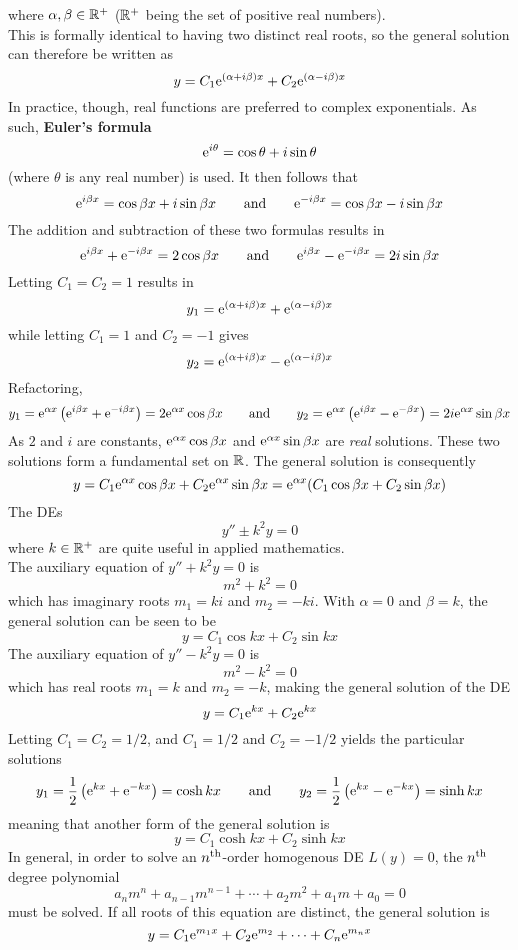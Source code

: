 \documentclass[./Differential Equations]{subfiles}
\begin{document}
					where \(\alpha, \beta \in \mathbb{R}^+\) (\(\mathbb{R}^+\) being the set of positive real numbers). \\
					This is formally identical to having two distinct real roots, so the general solution can therefore be written as
					\[y = C_1\text{e}^{(\alpha + i\beta)x} + C_2\text{e}^{(\alpha - i\beta)x}\]
					In practice, though, real functions are preferred to complex exponentials. As such, \textbf{Euler's formula}
					\[\text{e}^{i\theta} = \cos\theta + i\sin\theta\]
					(where \(\theta\) is any real number) is used. It then follows that
					\[
						\text{e}^{i\beta x} = \cos\beta x + i\sin\beta x \qquad \text{and} \qquad
								\text{e}^{-i\beta x} = \cos\beta x - i\sin\beta x
					\]
					The addition and subtraction of these two formulas results in
					\[
						\text{e}^{i\beta x} + \text{e}^{-i\beta x} = 2\cos\beta x \qquad \text{and} \qquad
								\text{e}^{i\beta x} - \text{e}^{-i\beta x} = 2i\sin \beta x	
					\]
					Letting \(C_1 = C_2 = 1\) results in
					\[
						y_1 = \text{e}^{(\alpha + i\beta)x} + \text{e}^{(\alpha - i\beta)x}
					\]
					while letting \(C_1 = 1\) and \(C_2 = -1\) gives
					\[
						y_2 = \text{e}^{(\alpha + i\beta)x} - \text{e}^{(\alpha - i\beta)x}
					\]
					Refactoring,
					\[
						y_1 = \text{e}^{\alpha x}\left(\text{e}^{i\beta x} + \text{e}^{-i\beta x}\right) = 2\text{e}^{\alpha x}\cos\beta x \qquad \text{and} \qquad
								y_2 = \text{e}^{\alpha x}\left(\text{e}^{i\beta x} - \text{e}^{-\beta x}\right) = 2i\text{e}^{\alpha x}\sin\beta x
					\]
					As \(2\) and \(i\) are constants, \(\text{e}^{\alpha x}\cos\beta x\) and \(\text{e}^{\alpha x}\sin\beta x\) are \textit{real} solutions. These two solutions form a fundamental set on \(\mathbb{R}\). The general solution is consequently
					\[
						y = C_1\text{e}^{\alpha x}\cos\beta x + C_2\text{e}^{\alpha x}\sin\beta x
							= \text{e}^{\alpha x}(C_1\cos\beta x + C_2\sin\beta x) 
					\]
				The DEs
					\[y'' \pm k^2y = 0\]
					where \(k \in \mathbb{R}^+\) are quite useful in applied mathematics. \\
				The auxiliary equation of \(y'' + k^2y = 0\) is
					\[m^2 + k^2 = 0\]
					which has imaginary roots \(m_1 = ki\) and \(m_2 = -ki\). With \(\alpha = 0\) and \(\beta = k\), the general solution can be seen to be
					\[y = C_1\cos kx + C_2\sin kx\]
				The auxiliary equation of \(y'' - k^2y = 0\) is
					\[m^2 - k^2 = 0\]
					which has real roots \(m_1 = k\) and \(m_2 = -k\), making the general solution of the DE
					\[y = C_1\text{e}^{kx} + C_2\text{e}^{kx}\]
				Letting \(C_1 = C_2 = 1/2\), and \(C_1 = 1/2\) and \(C_2 = -1/2\) yields the particular solutions
					\[
						y_1 = \frac{1}{2}\left(\text{e}^{kx} + \text{e}^{-kx}\right) = \cosh kx \qquad \text{and} \qquad
								y_2 = \frac{1}{2}\left(\text{e}^{kx} - \text{e}^{-kx}\right) = \sinh kx 
					\]
					meaning that another form of the general solution is
					\[y = C_1\cosh kx + C_2\sinh kx\]
				In general, in order to solve an \(n^{\text{th}}\)-order homogenous DE \(L(y) = 0\), the \(n^{\text{th}}\) degree polynomial
					\[a_nm^n + a_{n - 1}m^{n - 1} + \cdots + a_2m^2 + a_1m + a_0 = 0\]
					must be solved. If all roots of this equation are distinct, the general solution is
					\[y = C_1\text{e}^{m_1x} + C_2\text{e}^{m_2} + \cdots + C_n\text{e}^{m_nx}\]
\end{document}
